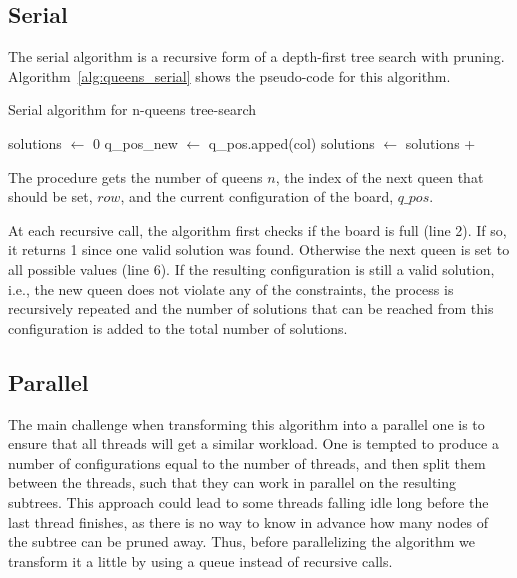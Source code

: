 \subsection{Serial}
The serial algorithm is a recursive form of a depth-first tree search with pruning.
Algorithm~\ref{alg:queens_serial} shows the pseudo-code for this algorithm.

\begin{algorithm}[H]
\caption{Serial algorithm for n-queens tree-search}
\label{alg:queens_serial}
\begin{algorithmic}[1]
            \State{}
        \EndIf
        
        \State solutions $\gets$ 0
            \State q\_pos\_new $\gets$ q\_pos.apped(col)
                \State solutions $\gets$ solutions + 
            \EndIf
        \EndFor
        \State{}
    \EndFunction
\end{algorithmic}
\end{algorithm}

The procedure gets the number of queens $n$, the index of the next queen that should be set, $row$, and the current configuration of the board, $q\_pos$.

At each recursive call, the algorithm first checks if the board is full (line 2).
If so, it returns 1 since one valid solution was found.
Otherwise the next queen is set to all possible values (line 6).
If the resulting configuration is still a valid solution, i.e., the new queen does not violate any of the constraints, the process is recursively repeated and the number of solutions that can be reached from this configuration is added to the total number of solutions.

\subsection{Parallel}
The main challenge when transforming this algorithm into a parallel one is to ensure that all threads will get a similar workload.
One is tempted to produce a number of configurations equal to the number of threads, and then split them between the threads, such that they can work in parallel on the resulting subtrees.
This approach could lead to some threads falling idle long before the last thread finishes, as there is no way to know in advance how many nodes of the subtree can be pruned away.
Thus, before parallelizing the algorithm we transform it a little by using a queue instead of recursive calls.

